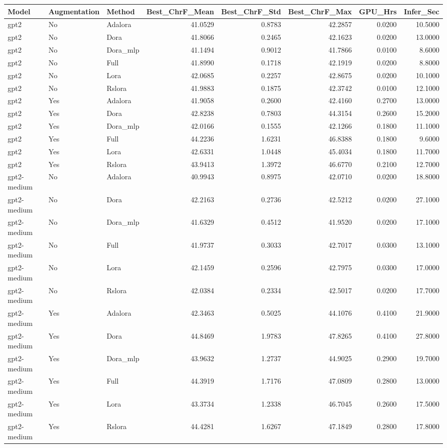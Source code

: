 \begin{tabular}{lllrrrrr}
\toprule
Model & Augmentation & Method & Best_ChrF_Mean & Best_ChrF_Std & Best_ChrF_Max & GPU_Hrs & Infer_Sec \\
\midrule
gpt2 & No & Adalora & 41.0529 & 0.8783 & 42.2857 & 0.0200 & 10.5000 \\
gpt2 & No & Dora & 41.8066 & 0.2465 & 42.1623 & 0.0200 & 13.0000 \\
gpt2 & No & Dora_mlp & 41.1494 & 0.9012 & 41.7866 & 0.0100 & 8.6000 \\
gpt2 & No & Full & 41.8990 & 0.1718 & 42.1919 & 0.0200 & 8.8000 \\
gpt2 & No & Lora & 42.0685 & 0.2257 & 42.8675 & 0.0200 & 10.1000 \\
gpt2 & No & Rslora & 41.9883 & 0.1875 & 42.3742 & 0.0100 & 12.1000 \\
gpt2 & Yes & Adalora & 41.9058 & 0.2600 & 42.4160 & 0.2700 & 13.0000 \\
gpt2 & Yes & Dora & 42.8238 & 0.7803 & 44.3154 & 0.2600 & 15.2000 \\
gpt2 & Yes & Dora_mlp & 42.0166 & 0.1555 & 42.1266 & 0.1800 & 11.1000 \\
gpt2 & Yes & Full & 44.2236 & 1.6231 & 46.8388 & 0.1800 & 9.6000 \\
gpt2 & Yes & Lora & 42.6331 & 1.0448 & 45.4034 & 0.1800 & 11.7000 \\
gpt2 & Yes & Rslora & 43.9413 & 1.3972 & 46.6770 & 0.2100 & 12.7000 \\
gpt2-medium & No & Adalora & 40.9943 & 0.8975 & 42.0710 & 0.0200 & 18.8000 \\
gpt2-medium & No & Dora & 42.2163 & 0.2736 & 42.5212 & 0.0200 & 27.1000 \\
gpt2-medium & No & Dora_mlp & 41.6329 & 0.4512 & 41.9520 & 0.0200 & 17.1000 \\
gpt2-medium & No & Full & 41.9737 & 0.3033 & 42.7017 & 0.0300 & 13.1000 \\
gpt2-medium & No & Lora & 42.1459 & 0.2596 & 42.7975 & 0.0300 & 17.0000 \\
gpt2-medium & No & Rslora & 42.0384 & 0.2334 & 42.5017 & 0.0200 & 17.7000 \\
gpt2-medium & Yes & Adalora & 42.3463 & 0.5025 & 44.1076 & 0.4100 & 21.9000 \\
gpt2-medium & Yes & Dora & 44.8469 & 1.9783 & 47.8265 & 0.4100 & 27.8000 \\
gpt2-medium & Yes & Dora_mlp & 43.9632 & 1.2737 & 44.9025 & 0.2900 & 19.7000 \\
gpt2-medium & Yes & Full & 44.3919 & 1.7176 & 47.0809 & 0.2800 & 13.0000 \\
gpt2-medium & Yes & Lora & 43.3734 & 1.2338 & 46.7045 & 0.2600 & 17.5000 \\
gpt2-medium & Yes & Rslora & 44.4281 & 1.6267 & 47.1849 & 0.2800 & 17.8000 \\
\bottomrule
\end{tabular}
